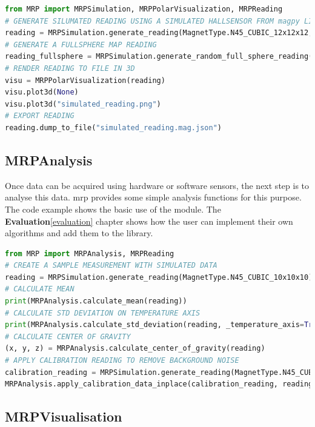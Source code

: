\begin{lstlisting}[language=Python, caption={MRPSimulation example illustrates the usage of several data analysis functions}, label=lst:mrpexample_simulation]
from MRP import MRPSimulation, MRPPolarVisualization, MRPReading
# GENERATE SILUMATED READING USING A SIMULATED HALLSENSOR FROM magpy LIBRARY
reading = MRPSimulation.generate_reading(MagnetType.N45_CUBIC_12x12x12,_add_random_polarisation=True)
# GENERATE A FULLSPHERE MAP READING
reading_fullsphere = MRPSimulation.generate_random_full_sphere_reading()
# RENDER READING TO FILE IN 3D
visu = MRPPolarVisualization(reading)
visu.plot3d(None)
visu.plot3d("simulated_reading.png")
# EXPORT READING
reading.dump_to_file("simulated_reading.mag.json")
\end{lstlisting}

\hypertarget{mrpanalysis}{%
\subsection{MRPAnalysis}\label{mrpanalysis}}

Once data can be acquired using hardware or software sensors, the next
step is to analyse this data. \gls{mrp} provides some simple analysis
functions for this purpose. The code example shows the basic use of the
module. The \textbf{Evaluation}\ref{evaluation} chapter shows how the
user can implement their own algorithms and add them to the library.

\begin{lstlisting}[language=Python, caption={MRPAnalysis example code performs several data analysis steps}, label=lst:mrpexample_analysis]
from MRP import MRPAnalysis, MRPReading
# CREATE A SAMPLE MEASUREMENT WITH SIMULATED DATA
reading = MRPSimulation.generate_reading(MagnetType.N45_CUBIC_10x10x10)
# CALCULATE MEAN
print(MRPAnalysis.calculate_mean(reading))
# CALCULATE STD DEVIATION ON TEMPERATURE AXIS
print(MRPAnalysis.calculate_std_deviation(reading, _temperature_axis=True))
# CALCULATE CENTER OF GRAVITY
(x, y, z) = MRPAnalysis.calculate_center_of_gravity(reading)
# APPLY CALIBRATION READING TO REMOVE BACKGROUND NOISE
calibration_reading = MRPSimulation.generate_reading(MagnetType.N45_CUBIC_10x10x10, _ideal = True)
MRPAnalysis.apply_calibration_data_inplace(calibration_reading, reading)
\end{lstlisting}

\hypertarget{mrpvisualisation}{%
\subsection{MRPVisualisation}\label{mrpvisualisation}}

